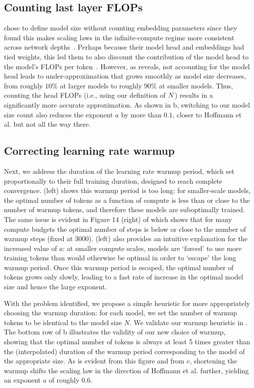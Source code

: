 \documentclass{article}
\makeatletter
\theoremstyle{plain}
\theoremstyle{definition}
\theoremstyle{remark}
\newcommand{\maybeSubscript}[1]{
  \ifthenelse{\equal{#1}{}}{}{_{#1}}%
}
\newcommand{\Hoffmann}{Hoffmann et al.\@\xspace}
\newcommand{\params}[1][]{N\maybeSubscript{#1}}
\newcommand{\nExp}{a}
\newcommand{\tentative}[1]{{\bf \color{red} #1}}
\renewcommand{\tentative}[1]{#1\xspace}
\makeatother
\begin{document}
\subsection{Counting last layer FLOPs}\label{subsec:flop_count}
\citet{kaplan2020scaling} chose to define model size without counting embedding parameters since they found this makes scaling laws in the infinite-compute regime more consistent across network depths~\citep[Figure 6]{kaplan2020scaling}. Perhaps because their model head and embeddings had tied weights, this led them to also discount the contribution of the model head to the model's FLOPs per token~\citep[Table 1, last row]{kaplan2020scaling}. 
However, as  reveals, not accounting for the model head leads to under-approximation that grows smoothly as model size decreases, from roughly $10\%$ at larger models to roughly $90\%$ at smaller models. 
Thus, counting the head FLOPs (i.e., using our definition of $\params$) results in a significantly more accurate approximation. As shown in b, switching to our model size count also reduces the exponent $\nExp$ by more than $0.1$, closer to \Hoffmann but not all the way there.

\subsection{Correcting learning rate warmup}\label{subsec:correct_WU}
Next, we address the duration of the learning rate warmup period, which \citet{kaplan2020scaling} set proportionally to their full training duration, designed to reach complete convergence.   (left) shows this warmup period is too long: for smaller-scale models, the optimal number of tokens as a function of compute is less than or close to the number of warmup tokens, and therefore these models are suboptimally trained. The same issue is evident in Figure 14 (right) of \citet{kaplan2020scaling} which shows that for many compute budgets the optimal number of steps is below or close to the number of warmup steps (fixed at 3000).  (left) also provides an intuitive explanation for the increased value of $\nExp$: at smaller compute scales, models are `forced' to use more training tokens than would otherwise be optimal in order to `escape' the long warmup period. Once this warmup period is escaped, the optimal number of tokens grows only slowly, leading to a fast rate of increase in the optimal model size and hence the large exponent.

With the problem identified, we propose a simple heuristic for more appropriately choosing the warmup duration: for each model, we set the number of warmup tokens to be identical to the model size $N$. We validate our warmup heuristic in . The bottom row of b illustrates the validity of our new choice of warmup, showing that the optimal number of tokens is always at least 5 times greater than the (interpolated) duration of the warmup period corresponding to the model of the appropriate size. As is evident from this figure and from c, shortening the warmup shifts the scaling law in the direction of \Hoffmann further, yielding an exponent $\nExp$ of roughly \tentative{0.6}. 
\end{document}
